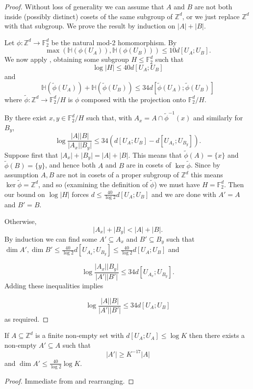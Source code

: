 \begin{proof}\leanok
Without loss of generality we can assume that $A$ and $B$ are not both inside (possibly distinct) cosets of the same subgroup of $\mathbb{Z}^d$, or we just replace $\mathbb{Z}^d$ with that subgroup. We prove the result by induction on $\lvert A\rvert+\lvert B\rvert$.

Let $\phi:\mathbb{Z}^d\to \mathbb{F}_2^d$ be the natural mod-2 homomorphism. By 
\[\max(\mathbb{H}(\phi(U_A)),\mathbb{H}(\phi(U_B)))\leq 10d[U_A;U_B].\]
We now apply , obtaining some subgroup $H\leq \mathbb{F}_2^d$ such that
\[\log \lvert H\rvert \leq 40d[U_A;U_B]\]
and
\[\mathbb{H}(\tilde{\phi}(U_A))+\mathbb{H}(\tilde{\phi}(U_B))\leq 34 d[\tilde{\phi}(U_A);\tilde{\phi}(U_B)]\]
where $\tilde{\phi}:\mathbb{Z}^d\to \mathbb{F}_2^d/H$ is $\phi$ composed with the projection onto $\mathbb{F}_2^d/H$.


By  there exist $x,y\in \mathbb{F}_2^d/H$ such that, with $A_x=A\cap \tilde{\phi}^{-1}(x)$ and similarly for $B_y$,
\[\log \frac{\lvert A\rvert\lvert B\rvert}{\lvert A_x\rvert\lvert B_y\rvert}\leq 34(d[U_A;U_B]-d[U_{A_x};U_{B_y}]).\]
Suppose first that $\lvert A_x\rvert+\lvert B_y\rvert=\lvert A\rvert+\lvert B\rvert$. This means that $\tilde{\phi}(A)=\{x\}$ and $\tilde{\phi}(B)=\{y\}$, and hence both $A$ and $B$ are in cosets of $\ker \tilde{\phi}$. Since by assumption $A,B$ are not in cosets of a proper subgroup of $\mathbb{Z}^d$ this means $\ker\tilde{\phi}=\mathbb{Z}^d$, and so (examining the definition of $\tilde{\phi}$) we must have $H=\mathbb{F}_2^d$. Then our bound on $\log\lvert H\rvert$ forces $d\leq \frac{40}{\log 2}d[U_A;U_B]$ and we are done with $A'=A$ and $B'=B$.

Otherwise,
\[\lvert A_x\rvert+\lvert B_y\rvert <\lvert A\rvert+\lvert B\rvert.\]
By induction we can find some $A'\subseteq A_x$ and $B'\subseteq B_y$ such that $\dim A',\dim B'\leq \frac{40}{\log 2} d[U_{A_x};U_{B_y}]\leq \frac{40}{\log 2}d[U_A;U_B]$ and

\[\log \frac{\lvert A_x\rvert\lvert B_y\rvert}{\lvert A'\rvert\lvert B'\rvert}\leq 34d[U_{A_x};U_{B_y}].\]
Adding these inequalities implies

\[\log\frac{\lvert A\rvert\lvert B\rvert}{\lvert A'\rvert\lvert B'\rvert}\leq 34d[U_A;U_B]\]
as required.
\end{proof}

\begin{theorem}
  \label{weak-pfr-symm}
  \leanok

  If $A\subseteq \mathbb{Z}^d$ is a finite non-empty set with $d[U_A;U_A]\leq \log K$
  then there exists a non-empty $A'\subseteq A$ such that
  \[\lvert A'\rvert\geq K^{-17}\lvert A\rvert\]
  and $\dim A'\leq \frac{40}{\log 2} \log K$.
\end{theorem}
\begin{proof}\leanok
Immediate from  and rearranging.
\end{proof}

